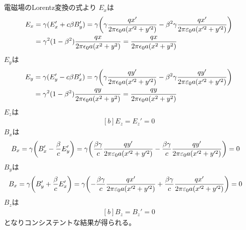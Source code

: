\documentclass[../../sp_2014.tex]{subfiles}
\begin{document}
\subsection{}
電磁場のLorentz変換の式より
\(E_x\)は
\begin{equation}\begin{aligned}[b]
    E_x &= \gamma(E_x'+c\beta B_y')
    = \gamma\qty(\gamma \frac{qx'}{2\pi\epsilon_0a(x'^2+y'^2)}-\beta^2\gamma\frac{qx'}{2\pi\varepsilon_0 a(x'^2+y'^2)})\\
    &= \gamma^2(1-\beta^2) \frac{qx}{2\pi\epsilon_0a(x^2+y^2)}
    = \frac{qx}{2\pi\epsilon_0a(x^2+y^2)}
\end{aligned}\end{equation}
\(E_y\)は
\begin{equation}\begin{aligned}[b]
    E_y &= \gamma(E_y'-c\beta B_x')
    = \gamma\qty(\gamma \frac{qy'}{2\pi\epsilon_0a(x'^2+y'^2)}-\beta^2\gamma\frac{qy'}{2\pi\varepsilon_0 a(x'^2+y'^2)})\\
    &= \gamma^2(1-\beta^2) \frac{qy}{2\pi\epsilon_0a(x^2+y^2)}
    = \frac{qy}{2\pi\epsilon_0a(x^2+y^2)}
\end{aligned}\end{equation}
\(E_z\)は
\begin{equation}\begin{aligned}[b]
    E_z = E_z' =0
\end{aligned}\end{equation}
\(B_x\)は
\begin{equation}\begin{aligned}[b]
    B_x &= \gamma\qty(B_x'-\frac{\beta}{c}E_y')
    = \gamma\qty( \frac{\beta\gamma}{c}\frac{q y'}{2\pi\varepsilon_0 a(x'^2+y'^2)}- \frac{\beta\gamma}{c}\frac{q y'}{2\pi\varepsilon_0 a(x'^2+y'^2)})
    = 0
\end{aligned}\end{equation}
\(B_y\)は
\begin{equation}\begin{aligned}[b]
    B_x &= \gamma\qty(B_y'+\frac{\beta}{c}E_x')
    = \gamma\qty(-\frac{\beta\gamma}{c}\frac{q x'}{2\pi\varepsilon_0 a(x'^2+y'^2)}+ \frac{\beta\gamma}{c}\frac{q x'}{2\pi\varepsilon_0 a(x'^2+y'^2)})
    = 0
\end{aligned}\end{equation}
\(B_z\)は
\begin{equation}\begin{aligned}[b]
    B_z = B_z' =0
\end{aligned}\end{equation}
となりコンシステントな結果が得られる。
\end{document}
